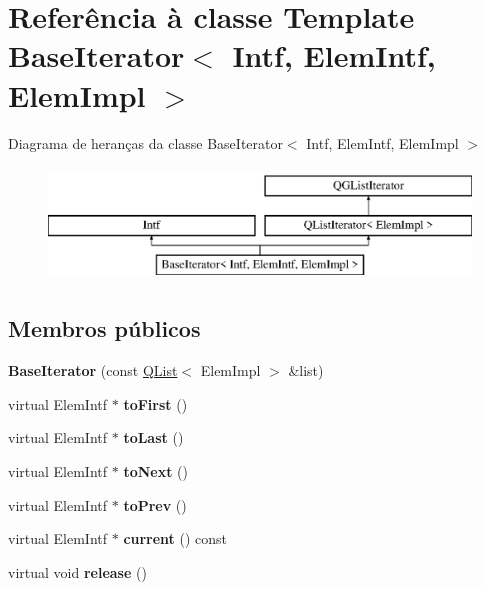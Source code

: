 \hypertarget{class_base_iterator}{\section{Referência à classe Template Base\-Iterator$<$ Intf, Elem\-Intf, Elem\-Impl $>$}
\label{class_base_iterator}
}
Diagrama de heranças da classe Base\-Iterator$<$ Intf, Elem\-Intf, Elem\-Impl $>$\begin{figure}[H]
\begin{center}
\leavevmode
\includegraphics[height=3.000000cm]{class_base_iterator}
\end{center}
\end{figure}
\subsection*{Membros públicos}
\begin{DoxyCompactItemize}
\item 
\hypertarget{class_base_iterator_abdfa36792ec4e4e60ec2c49b57553d28}{{\bfseries Base\-Iterator} (const \hyperlink{class_q_list}{Q\-List}$<$ Elem\-Impl $>$ \&list)}\label{class_base_iterator_abdfa36792ec4e4e60ec2c49b57553d28}

\item 
\hypertarget{class_base_iterator_abf229c0e1893f20877b578ac2c7e5159}{virtual Elem\-Intf $\ast$ {\bfseries to\-First} ()}\label{class_base_iterator_abf229c0e1893f20877b578ac2c7e5159}

\item 
\hypertarget{class_base_iterator_a48309b7fc55a5c4d1b108327ead3a727}{virtual Elem\-Intf $\ast$ {\bfseries to\-Last} ()}\label{class_base_iterator_a48309b7fc55a5c4d1b108327ead3a727}

\item 
\hypertarget{class_base_iterator_a7d8f0436378f74c321dedf57fb8dab4f}{virtual Elem\-Intf $\ast$ {\bfseries to\-Next} ()}\label{class_base_iterator_a7d8f0436378f74c321dedf57fb8dab4f}

\item 
\hypertarget{class_base_iterator_a4da1240445f01ecc893d9b579be90b57}{virtual Elem\-Intf $\ast$ {\bfseries to\-Prev} ()}\label{class_base_iterator_a4da1240445f01ecc893d9b579be90b57}

\item 
\hypertarget{class_base_iterator_a1e22b4c1f1bcd62f8d167baf6fde83cb}{virtual Elem\-Intf $\ast$ {\bfseries current} () const }\label{class_base_iterator_a1e22b4c1f1bcd62f8d167baf6fde83cb}

\item 
\hypertarget{class_base_iterator_af8a84115de3507728d5e19e804529052}{virtual void {\bfseries release} ()}\label{class_base_iterator_af8a84115de3507728d5e19e804529052}

\end{DoxyCompactItemize}
